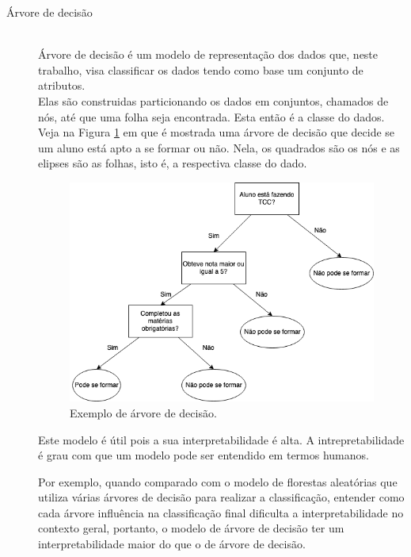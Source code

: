 \begin{description}
    \item[Árvore de decisão] \hfill \\ Árvore de decisão é um modelo de representação 
    dos dados que, neste trabalho, visa classificar os dados tendo como base um conjunto 
    de atributos. \\ 
    Elas são construidas particionando os dados em conjuntos, chamados de nós, 
    até que uma folha seja encontrada. Esta então é a classe do dados. Veja na Figura \ref{fig:ex_decision_tree} 
    em que é mostrada uma árvore de decisão que decide se um aluno está apto a se formar ou não. 
    Nela, os quadrados são os nós e as elipses são as folhas, isto é, a respectiva classe do 
    dado.
    \begin{figure}
        \centering
        \includegraphics[width=.8\textwidth]{figuras/ex_decicion_tree1.png}
        \caption{Exemplo de árvore de decisão.\label{fig:ex_decision_tree}}
    \end{figure}

    Este modelo é útil pois a sua interpretabilidade é alta. A intrepretabilidade é grau com que 
    um modelo pode ser entendido em termos humanos. 
    
    Por exemplo, quando comparado com o modelo de florestas aleatórias que utiliza várias 
    árvores de decisão para realizar a classificação, entender como cada árvore influência 
    na classificação final dificulta a interpretabilidade no contexto geral, portanto,
    o modelo de árvore de decisão ter um interpretabilidade maior do que o de árvore de 
    decisão.


\end{description}
